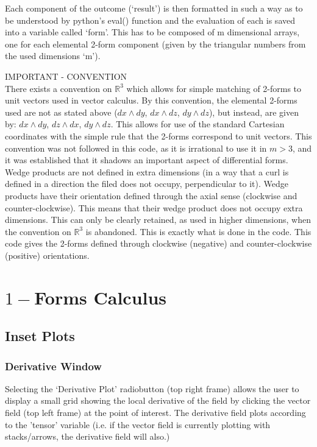 \documentclass[12pt]{report}
\begin{document}
Each component of the outcome (`result') is then formatted in such a way as to be understood by python's eval() function and the evaluation of each is saved into a variable called `form'. This has to be composed of m dimensional arrays, one for each elemental 2-form component (given by the triangular numbers from the used dimensions `m').

\begin{center}
	\Large
	IMPORTANT - CONVENTION\\
	\normalsize
	There exists a convention on $\mathbb{R}^{3}$ which allows for simple matching of 2-forms to unit vectors used in vector calculus. By this convention, the elemental 2-forms used are not as stated above ($ dx \wedge dy$, $ dx \wedge dz$, $ dy \wedge dz$), but instead, are given by: $dx \wedge dy$, $ dz \wedge dx$, $ dy \wedge dz$. This allows for use of the standard Cartesian coordinates with the simple rule that the 2-forms correspond to unit vectors. This convention was not followed in this code, as it is irrational to use it in $m>3$, and it was established that it shadows an important aspect of differential forms. Wedge products are not defined in extra dimensions (in a way that a curl is defined in a direction the filed does not occupy, perpendicular to it). Wedge products have their orientation defined through the axial sense (clockwise and counter-clockwise). This means that their wedge product does not occupy extra dimensions. This can only be clearly retained, as used in higher dimensions, when the convention on $\mathbb{R}^{3}$ is abandoned. This is exactly what is done in the code. This code gives the 2-forms defined through clockwise (negative) and counter-clockwise (positive) orientations.
\end{center}

\chapter{$1-$Forms Calculus}
\section{Inset Plots}
\subsection{Derivative Window}
Selecting the `Derivative Plot' radiobutton (top right frame) allows the user to display a small grid showing the local derivative of the field by clicking the vector field (top left frame) at the point of interest. The derivative field plots according to the 'tensor' variable (i.e. if the vector field is currently plotting with stacks/arrows, the derivative field will also.)
\end{document}
